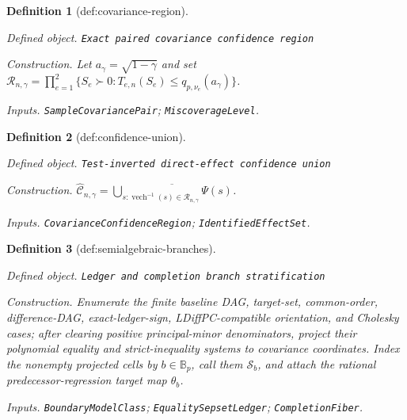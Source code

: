 \documentclass{article}
\newtheorem{definition}{Definition}
\begin{document}
\begin{definition}[def:covariance-region]\label{def:covariance-region}
\par\smallskip\noindent\emph{Defined object.} \texttt{Exact paired covariance confidence region}
\par\smallskip\noindent\emph{Construction.} Let \(a_{\gamma}=\sqrt{1-\gamma}\) and set \(\mathcal R_{n,\gamma}=\prod_{e=1}^2\{S_e\succ0:T_{e,n}(S_e)\le q_{p,\nu_e}(a_{\gamma})\}\).
\par\smallskip\noindent\emph{Inputs.} \texttt{SampleCovariancePair}; \texttt{MiscoverageLevel}.
\end{definition}

\begin{definition}[def:confidence-union]\label{def:confidence-union}
\par\smallskip\noindent\emph{Defined object.} \texttt{Test-\allowbreak{}inverted direct-\allowbreak{}effect confidence union}
\par\smallskip\noindent\emph{Construction.} \(\widehat{\mathcal C}_{n,\gamma}=\overline{\bigcup_{s:\operatorname{vech}^{-1}(s)\in\mathcal R_{n,\gamma}}\Psi(s)}\).
\par\smallskip\noindent\emph{Inputs.} \texttt{CovarianceConfidenceRegion}; \texttt{IdentifiedEffectSet}.
\end{definition}

\begin{definition}[def:semialgebraic-branches]\label{def:semialgebraic-branches}
\par\smallskip\noindent\emph{Defined object.} \texttt{Ledger and completion branch stratification}
\par\smallskip\noindent\emph{Construction.} Enumerate the finite baseline DAG, target-set, common-order, difference-DAG, exact-ledger-sign, LDiffPC-compatible orientation, and Cholesky cases; after clearing positive principal-minor denominators, project their polynomial equality and strict-inequality systems to covariance coordinates. Index the nonempty projected cells by \(b\in\mathbb B_p\), call them \(\mathcal S_b\), and attach the rational predecessor-regression target map \(\theta_b\).
\par\smallskip\noindent\emph{Inputs.} \texttt{BoundaryModelClass}; \texttt{EqualitySepsetLedger}; \texttt{CompletionFiber}.
\end{definition}
\end{document}
